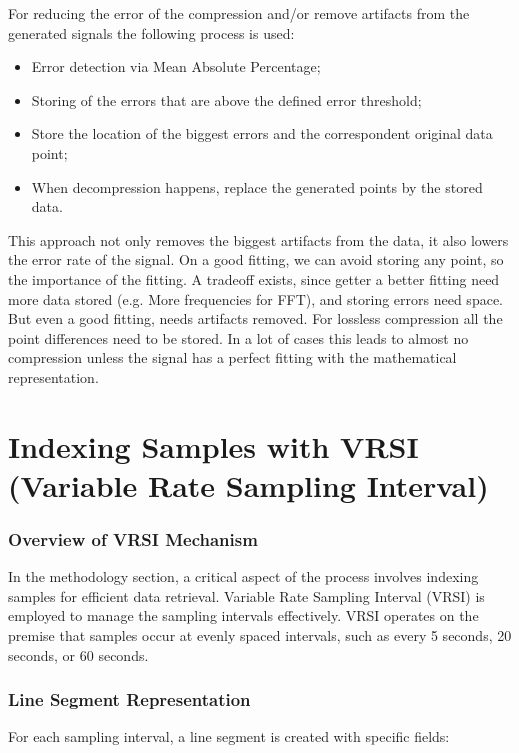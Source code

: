 \documentclass[conference]{IEEEtran}
\begin{document}
For reducing the error of the compression and/or remove artifacts from the generated signals the following process is used:

\begin{itemize}
    \item Error detection via Mean Absolute Percentage;
    \item Storing of the errors that are above the defined error threshold;
    \item Store the location of the biggest errors and the correspondent original data point;
    \item When decompression happens, replace the generated points by the stored data.
\end{itemize}

This approach not only removes the biggest artifacts from the data, it also lowers the error rate of the signal. On a good fitting, we can avoid storing any point, so the importance of the fitting.
A tradeoff exists, since getter a better fitting need more data stored (e.g. More frequencies for FFT), and storing errors need space. But even a good fitting, needs artifacts removed.
For lossless compression all the point differences need to be stored.
In a lot of cases this leads to almost no compression unless the signal has a perfect fitting with the mathematical representation.

\section{Indexing Samples with VRSI (Variable Rate Sampling Interval)}
\vspace{5pt}
\subsubsection{Overview of VRSI Mechanism}

In the methodology section, a critical aspect of the process involves indexing samples for efficient data retrieval. Variable Rate Sampling Interval (VRSI) is employed to manage the sampling intervals effectively. VRSI operates on the premise that samples occur at evenly spaced intervals, such as every 5 seconds, 20 seconds, or 60 seconds.
\vspace{5pt}
\subsubsection{Line Segment Representation}

For each sampling interval, a line segment is created with specific fields:
\end{document}
